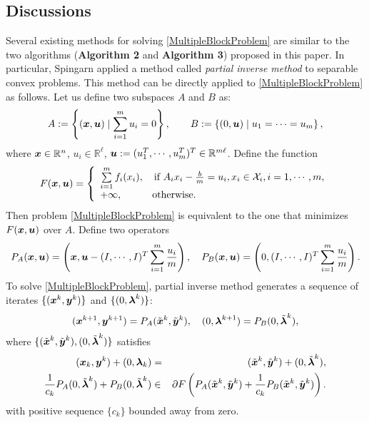 \documentclass{mcom-l}
\theoremstyle{definition}
\theoremstyle{remark}
\numberwithin{equation}{section}
\begin{document}
{\subsection{Discussions}
Several existing methods for solving \eqref{MultipleBlockProblem} are similar to the two algorithms ({\bf{Algorithm 2}} and {\bf{Algorithm 3}}) proposed in this paper. In particular, Spingarn \cite{Spingarn1985} applied a method called {\em{partial inverse method}} \cite{Spingarn1983} to separable convex problems. This method can be directly applied to \eqref{MultipleBlockProblem} as follows. Let us define two subspaces $A$ and $B$ as:
$$
A :=\left \{ ({{\mbox{\boldmath $x$}}},{{\mbox{\boldmath $u$}}})\mid \sum_{i=1}^m u_i = 0\right\},\qquad B :=\left \{(0,{{\mbox{\boldmath $u$}}})\mid u_1 = \cdots = u_m\right\},
$$
where ${{\mbox{\boldmath $x$}}}\in \mathbb{R}^n$, $u_i\in \mathbb{R}^{\ell}$, ${{\mbox{\boldmath $u$}}}:=(u_1^T,\cdots,u_m^T)^T\in \mathbb{R}^{m\ell}$.
Define the function
$$
F({{\mbox{\boldmath $x$}}},{{\mbox{\boldmath $u$}}}) = \left\{\begin{array}{l}
            \sum\limits_{i=1}^m f_i(x_i),\quad \hbox{if } A_i x_i - \frac{b}{m} = u_i, x_i\in {\mathcal{X}}_i, i = 1,\cdots,m,\nonumber\\
            +\infty,\qquad\quad \hbox{otherwise}.\nonumber\\
            \end{array}\right.
$$
Then problem \eqref{MultipleBlockProblem} is equivalent to the one that minimizes $F({{\mbox{\boldmath $x$}}},{{\mbox{\boldmath $u$}}})$ over $A$. Define two operators $$
P_{A} ({{\mbox{\boldmath $x$}}},{{\mbox{\boldmath $u$}}}) = \left({{\mbox{\boldmath $x$}}}, {{\mbox{\boldmath $u$}}} - (I,\cdots,I)^T\sum\limits_{i=1}^m \frac{u_i}{m}\right),\quad P_{B} ({{\mbox{\boldmath $x$}}},{{\mbox{\boldmath $u$}}}) = \left(0,(I,\cdots,I)^T \sum\limits_{i=1}^m \frac{u_i}{m}\right).
$$
To solve \eqref{MultipleBlockProblem}, partial inverse method generates a sequence of iterates $\{({{\mbox{\boldmath $x$}}}^k,{{\mbox{\boldmath $y$}}}^k)\}$ and $\{(0,{{\mbox{\boldmath $\lambda$}}}^k)\}$:
$$
({{\mbox{\boldmath $x$}}}^{k+1},{{\mbox{\boldmath $y$}}}^{k+1}) = P_{A}(\tilde{{\mbox{\boldmath $x$}}}^k,\tilde{{\mbox{\boldmath $y$}}}^k),\quad (0,{{\mbox{\boldmath $\lambda$}}}^{k+1}) = P_{B}(0,\tilde{{\mbox{\boldmath $\lambda$}}}^k),
$$
where $\{(\tilde{{\mbox{\boldmath $x$}}}^k,\tilde{{\mbox{\boldmath $y$}}}^k),(0,\tilde{{\mbox{\boldmath $\lambda$}}}^k)\}$ satisfies
\begin{eqnarray}
({{\mbox{\boldmath $x$}}}_k,{{\mbox{\boldmath $y$}}}^k) + (0,{{\mbox{\boldmath $\lambda$}}}_k) &=& (\tilde{{\mbox{\boldmath $x$}}}^k,\tilde{{\mbox{\boldmath $y$}}}^k) + (0,\tilde{{\mbox{\boldmath $\lambda$}}}^k),\nonumber\\
\frac{1}{c_k} P_{A}(0,\tilde{{\mbox{\boldmath $\lambda$}}}^k) + P_{B}(0,\tilde{{\mbox{\boldmath $\lambda$}}}^k)&\in& \partial F \left( P_{A}(\tilde{{\mbox{\boldmath $x$}}}^k,\tilde{{\mbox{\boldmath $y$}}}^k) + \frac{1}{c_k}P_{B}(\tilde{{\mbox{\boldmath $x$}}}^k,\tilde{{\mbox{\boldmath $y$}}}^k) \right).\nonumber
\end{eqnarray}
with positive sequence $\{c_k\}$ bounded away from zero.

}
\end{document}
